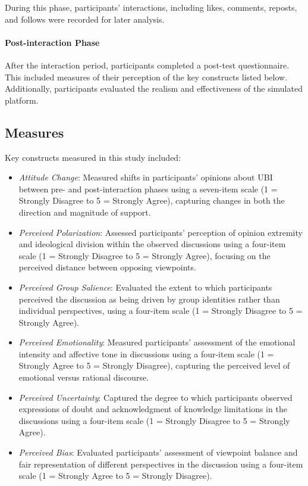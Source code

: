 During this phase, participants' interactions, including likes, comments, reposts, and follows were recorded for later analysis.

\paragraph{Post-interaction Phase} After the interaction period, participants completed a post-test questionnaire. This included measures of their perception of the key constructs listed below. Additionally, participants evaluated the realism and effectiveness of the simulated platform.

\subsection{Measures}

Key constructs measured in this study included:

\begin{itemize}
    \item \emph{Attitude Change}: Measured shifts in participants' opinions about UBI between pre- and post-interaction phases using a seven-item scale (1 = Strongly Disagree to 5 = Strongly Agree), capturing changes in both the direction and magnitude of support.
    
    \item \emph{Perceived Polarization}: Assessed participants' perception of opinion extremity and ideological division within the observed discussions using a four-item scale (1 = Strongly Disagree to 5 = Strongly Agree), focusing on the perceived distance between opposing viewpoints.
    
    \item \emph{Perceived Group Salience}: Evaluated the extent to which participants perceived the discussion as being driven by group identities rather than individual perspectives, using a four-item scale (1 = Strongly Disagree to 5 = Strongly Agree).
    
    \item \emph{Perceived Emotionality}: Measured participants' assessment of the emotional intensity and affective tone in discussions using a four-item scale (1 = Strongly Agree to 5 = Strongly Disagree), capturing the perceived level of emotional versus rational discourse.
    
    \item \emph{Perceived Uncertainty}: Captured the degree to which participants observed expressions of doubt and acknowledgment of knowledge limitations in the discussions using a four-item scale (1 = Strongly Disagree to 5 = Strongly Agree).
    
    \item \emph{Perceived Bias}: Evaluated participants' assessment of viewpoint balance and fair representation of different perspectives in the discussion using a four-item scale (1 = Strongly Agree to 5 = Strongly Disagree).
\end{itemize}

